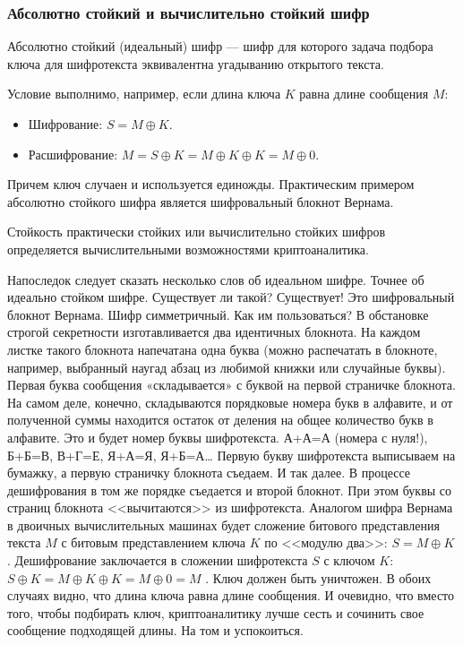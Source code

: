 \begin{frame}
    \frametitle{Абсолютно стойкий и вычислительно стойкий шифр}
    
    \alert{Абсолютно стойкий (идеальный)} шифр --- шифр для которого задача подбора ключа для шифротекста эквивалентна угадыванию открытого текста.
    
    Условие выполнимо, например, если длина ключа $K$ равна длине сообщения $M$:
    \begin{itemize}
        \item Шифрование: \(S=M\oplus K.\)
        \item Расшифрование: \(M=S\oplus K=M\oplus K\oplus K=M\oplus 0.\)
    \end{itemize}
    Причем ключ случаен и используется единожды. Практическим примером абсолютно стойкого шифра является \alert{шифровальный блокнот Вернама}.
    
    Стойкость \alert{практически стойких} или \alert{вычислительно стойких} шифров определяется вычислительными возможностями криптоаналитика.
\end{frame}


Напоследок следует сказать несколько слов об идеальном шифре. Точнее об идеально стойком шифре. Существует ли такой? Существует! Это шифровальный блокнот Вернама. Шифр симметричный. Как им пользоваться? В обстановке строгой секретности изготавливается два идентичных блокнота. На каждом листке такого блокнота напечатана одна буква (можно распечатать в блокноте, например, выбранный наугад абзац из любимой книжки или случайные буквы). Первая буква сообщения «складывается» с буквой на первой страничке блокнота. На самом деле, конечно, складываются порядковые номера букв в алфавите, и от полученной суммы находится остаток от деления на общее количество букв в алфавите. Это и будет номер буквы шифротекста. А+А=А (номера с нуля!), Б+Б=В, В+Г=Е, Я+А=Я, Я+Б=А… Первую букву шифротекста выписываем на бумажку, а первую страничку блокнота съедаем. И так далее. В процессе дешифрования в том же порядке съедается и второй блокнот. При этом буквы со страниц блокнота <<вычитаются>> из шифротекста. Аналогом шифра Вернама в двоичных вычислительных машинах будет сложение битового представления текста $M$ с битовым представлением ключа $K$ по <<модулю два>>: $S=M\oplus K$ . Дешифрование заключается в сложении шифротекста $S$ с ключом $K$: $S\oplus K=M\oplus K\oplus K=M\oplus 0=M$ . Ключ должен быть уничтожен. В обоих случаях видно, что длина ключа равна длине сообщения. И очевидно, что вместо того, чтобы подбирать ключ, криптоаналитику лучше сесть и сочинить свое сообщение подходящей длины. На том и успокоиться.


